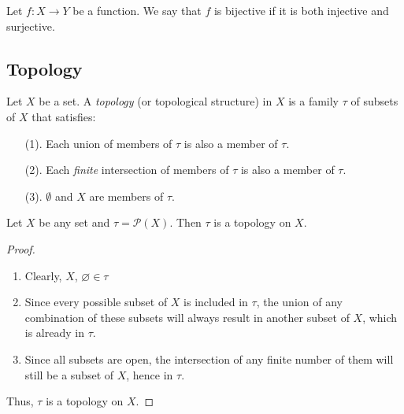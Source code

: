 \documentclass[12pt]{article} %
\begin{document}
\begin{definition}\parencite{holmes_topology}
Let \( f : X \to Y \) be a function. We say that \( f \) is bijective if it is both injective and surjective.
\end{definition}


\subsection{Topology}
\begin{definition}[Topology]\parencite{Dugundji1966} 
Let $X$ be a set. A \textit{topology} (or topological structure) in $X$ is a family $\tau $ of subsets of $X$ that satisfies:
\begin{enumerate}
    \item [(1).] Each union of members of $\tau$ is also a member of $\tau$.
    \item [(2).] Each \textit{finite} intersection of members of $\tau$ is also a member of $\tau$.
    \item [(3).] $\emptyset$ and $X$ are members of $\tau$.
\end{enumerate}
\end{definition}

\begin{example}
 Let $X$ be any set and 
 $\tau=\mathcal{P}(X)$. Then $\tau$ is a topology on $X$.
 \begin{proof}  ~\\
 \begin{enumerate}
     \item Clearly, $X$, $\varnothing \in \tau$
     \item Since every possible subset of $X$ is included in $\tau$, the union of any combination of these subsets will always result in another subset of $X$, which is already in $\tau$.
     \item Since all subsets are open, the intersection of any finite number of them will still be a subset of $X$, hence in $\tau$.
 \end{enumerate}
 Thus, $\tau$ is a topology on $X$.
 \end{proof}
\end{example}
\end{document}
